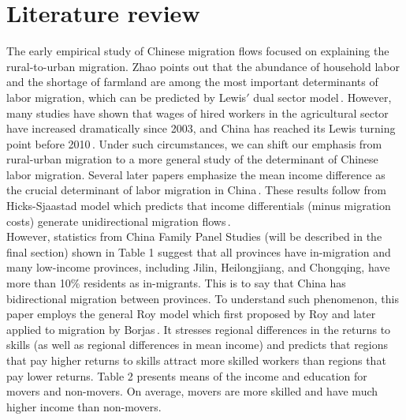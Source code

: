 \documentclass{article}
\begin{document}
\section{Literature review}\label{second_section}

The early empirical study of Chinese migration flows focused on explaining the rural-to-urban migration. Zhao points out that the abundance of household labor and the shortage of farmland are among the most important determinants of labor migration, which can be predicted by Lewis$'$ dual sector model\,\cite{zhao_labor_1999}. However, many studies have shown that wages of hired workers in the agricultural sector have increased dramatically since 2003, and China has reached its Lewis turning point before 2010\,\cite{zhang_china_2011,cai_wage_2011}. Under such circumstances, we can shift our emphasis from rural-urban migration to a more general study of the determinant of Chinese labor migration. Several later papers emphasize the mean income difference as the crucial determinant of labor migration in China\,\cite{zhu_impacts_2002}. These results follow from Hicks-Sjaastad model which predicts that income differentials (minus migration costs) generate unidirectional migration flows\,\cite{sjaastad_costs_1962, hicks_theory_1963}.\\


However, statistics from China Family Panel Studies (will be described in the final section) shown in Table 1 suggest that all provinces have in-migration and many low-income provinces, including Jilin, Heilongjiang, and Chongqing, have more than 10\% residents as in-migrants. This is to say that China has bidirectional migration between provinces. To understand such phenomenon, this paper employs the general Roy model which first proposed by Roy and later applied to migration by Borjas\,\cite{borjas_self-selection_1992}. It stresses regional differences in the returns to skills (as well as regional differences in mean income) and predicts that regions that pay higher returns to skills attract more skilled workers than regions that pay lower returns. Table 2 presents means of the income and education for movers and non-movers. On average, movers are more skilled and have much higher income than non-movers.
\end{document}
